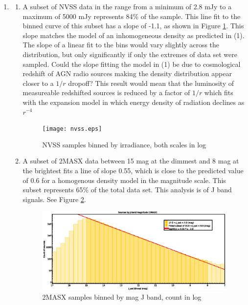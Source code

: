 \documentclass{paper}
\begin{document}
\begin{enumerate}
  \pagebreak \item %
    \begin{enumerate}
      \item
        A subset of NVSS data in the range from a minimum of 2.8 mJy to a
        maximum of 5000 mJy represents 84\% of the sample. This line fit to 
        the binned curve of this subset has a slope of -1.1, as shown in 
        Figure \ref{fig:nvss-bins}. This slope matches the model of an 
        inhomogeneous density as predicted in (1).  The slope of a linear fit 
        to the bins would vary slightly across the distribution, but only 
        significantly if only the extremes of data set were sampled.  Could 
        the slope fitting the model in (1) be due to cosmological redshift of 
        AGN radio sources making the density distribution appear closer to a 
        \(1/r\) dropoff? This result would mean that the luminosity of 
        measureable redshifted sources is reduced by a factor of \(1/r\) which 
        fits with the expansion model in which energy density of radiation 
        declines as \(r^{-4}\)

        \begin{figure}[!htb]
          \texttt{[image: nvss.eps]}
          \caption{NVSS samples binned by irradiance, both scales in log}
          \label{fig:nvss-bins}
        \end{figure}

      \item
        A subset of 2MASX data between 15 mag at the dimmest and 8 mag at the
        brightest fits a line of slope 0.55, which is close to the predicted
        value of 0.6 for a homogenous density model in the magnitude scale.
        This subset represents 65\% of the total data set. This analysis
        is of J band signals. See Figure \ref{fig:2masx-bins}.

        \begin{figure}[!htb]
          \includegraphics[width=\linewidth]{2masx.eps}
          \caption{2MASX samples binned by mag J band, count in log}
          \label{fig:2masx-bins}
        \end{figure}


\end{enumerate}
\end{enumerate}
\end{document}
